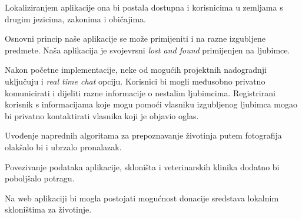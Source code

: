 		\begin{packed_item}
		
			\item Lokaliziranjem aplikacije ona bi postala dostupna i korisnicima u zemljama s drugim jezicima, zakonima i običajima.
			
			\item Osnovni princip naše aplikacije se može primijeniti i na razne izgubljene predmete. Naša aplikacija je svojevrsni \textit{lost and found} primijenjen na ljubimce.
			
			\item Nakon početne implementacije, neke od mogućih projektnih nadogradnji uključuju i \textit{real time chat} opciju. Korisnici bi mogli međusobno privatno komunicirati i dijeliti razne informacije o nestalim ljubimcima. Registrirani korisnik s informacijama koje mogu pomoći vlasniku izgubljenog ljubimca mogao bi privatno kontaktirati vlasnika koji je objavio oglas.
			
			\item Uvođenje naprednih algoritama za prepoznavanje životinja putem fotografija olakšalo bi i ubrzalo pronalazak.
			
			\item Povezivanje podataka aplikacije, skloništa i veterinarskih klinika dodatno bi poboljšalo potragu.
			
			\item Na web aplikaciji bi mogla postojati mogućnost donacije sredstava lokalnim skloništima za životinje.
			
		\end{packed_item}
		
		\eject